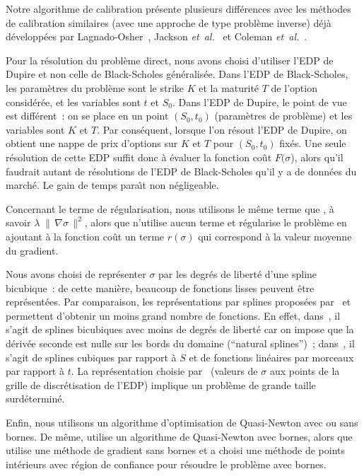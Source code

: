 Notre algorithme de calibration pr\'esente plusieurs diff\'erences 
avec les m\'ethodes de calibration similaires (avec une approche 
de type probl\`eme inverse) d\'ej\`a d\'evelopp\'ees par 
Lagnado-Osher~\cite{lag:jcf:97}, 
Jackson {\em et~al.}~\cite{jac:jcf:98} et 
Coleman {\em et~al.}~\cite{col:jcf:99}.

Pour la r\'esolution du probl\`eme direct, nous avons choisi 
d'utiliser l'EDP de Dupire et non celle de Black-Scholes 
g\'en\'eralis\'ee. Dans l'EDP de Black-Scholes, les param\`etres 
du probl\`eme sont le strike $K$ et la maturit\'e $T$ de l'option 
consid\'er\'ee, et les variables sont $t$ et $S_0$. Dans l'EDP de 
Dupire, le point de vue est diff\'erent~: on se place en un point 
$(S_0,t_0)$ (param\`etres de probl\`eme) et les variables sont $K$ 
et $T$. Par cons\'equent, lorsque l'on r\'esout l'EDP de Dupire, on 
obtient une nappe de prix d'options sur $K$ et $T$ pour $(S_0,t_0)$ 
fix\'es. Une seule r\'esolution de cette EDP suffit donc \`a 
\'evaluer la fonction co\^ut $F(\sigma$), alors qu'il faudrait 
autant de r\'esolutions de l'EDP de Black-Scholes qu'il y a 
de donn\'ees du march\'e. Le gain de temps para\^{\i}t non 
n\'egligeable.

Concernant le terme de r\'egularisation, nous utilisons le m\^eme 
terme que \cite{lag:jcf:97}, \`a savoir 
$\lambda \; \| \, \nabla \sigma \, \|^2$, alors que 
\cite{jac:jcf:98} n'utilise aucun terme et \cite{col:jcf:99} 
r\'egularise le probl\`eme en ajoutant \`a la fonction co\^ut un 
terme $r(\sigma)$ qui correspond \`a la valeur moyenne du gradient. 

Nous avons choisi de repr\'esenter $\sigma$ par les degr\'es de 
libert\'e d'une spline bicubique~: de cette mani\`ere, beaucoup de 
fonctions lisses peuvent \^etre repr\'esent\'ees. Par comparaison, 
les repr\'esentations par splines propos\'ees par~\cite{jac:jcf:98} 
et~\cite{col:jcf:99} permettent d'obtenir un moins grand nombre de 
fonctions. En effet, dans~\cite{col:jcf:99}, il s'agit de splines 
bicubiques avec moins de degr\'es de libert\'e car on impose que 
la d\'eriv\'ee seconde est nulle sur les bords du domaine 
(``natural splines'')~; dans~\cite{jac:jcf:98}, il s'agit de 
splines cubiques par rapport \`a $S$ et de fonctions lin\'eaires 
par morceaux par rapport \`a $t$. La repr\'esentation choisie 
par~\cite{lag:jcf:97} (valeurs de $\sigma$ aux points de la grille 
de discr\'etisation de l'EDP) implique un probl\`eme de grande 
taille surd\'etermin\'e.

Enfin, nous utilisons un algorithme d'optimisation de Quasi-Newton 
avec ou sans bornes. De m\^eme, \cite{jac:jcf:98} utilise un 
algorithme de Quasi-Newton avec bornes, alors que \cite{lag:jcf:97} 
utilise une m\'ethode de gradient sans bornes et \cite{col:jcf:99} 
a choisi une m\'ethode de points int\'erieurs avec r\'egion de 
confiance pour r\'esoudre le probl\`eme avec bornes.

